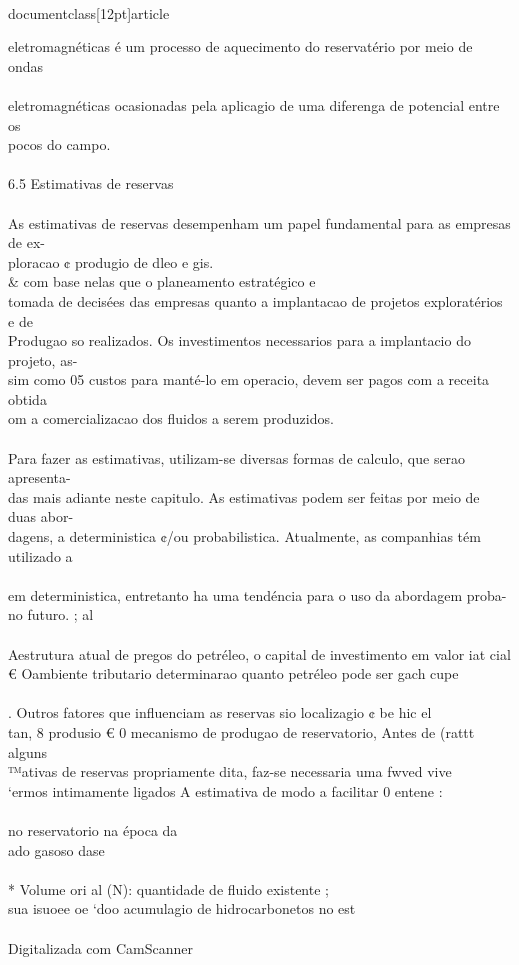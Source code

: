 \\documentclass[12pt]{article}
\begin{document}
eletromagnéticas é um processo de aquecimento do reservatério por meio de ondas\\
\\
eletromagnéticas ocasionadas pela aplicagio de uma diferenga de potencial entre os\\
pocos do campo.\\
\\
6.5 Estimativas de reservas\\
\\
As estimativas de reservas desempenham um papel fundamental para as empresas de ex-\\
ploracao ¢ produgio de dleo e gis. \\& com base nelas que o planeamento estratégico e\\
tomada de decisées das empresas quanto a implantacao de projetos exploratérios e de\\
Produgao so realizados. Os investimentos necessarios para a implantacio do projeto, as-\\
sim como 05 custos para manté-lo em operacio, devem ser pagos com a receita obtida\\
om a comercializacao dos fluidos a serem produzidos.\\
\\
Para fazer as estimativas, utilizam-se diversas formas de calculo, que serao apresenta-\\
das mais adiante neste capitulo. As estimativas podem ser feitas por meio de duas abor-\\
dagens, a deterministica ¢/ou probabilistica. Atualmente, as companhias tém utilizado a\\
\\
em deterministica, entretanto ha uma tendéncia para o uso da abordagem proba-\\
no futuro. ; al\\
\\
Aestrutura atual de pregos do petréleo, o capital de investimento em valor iat cial\\
€ Oambiente tributario determinarao quanto petréleo pode ser gach cupe\\
\\
. Outros fatores que influenciam as reservas sio localizagio ¢ be hic el\\
tan, 8 produsio € 0 mecanismo de produgao de reservatorio, Antes de (rattt alguns\\
™ativas de reservas propriamente dita, faz-se necessaria uma fwved vive\\
‘ermos intimamente ligados A estimativa de modo a facilitar 0 entene :\\
\\
no reservatorio na época da\\
ado gasoso dase\\
\\
* Volume ori al (N): quantidade de fluido existente ;\\
sua isuoee oe ‘doo acumulagio de hidrocarbonetos no est\\
\\
Digitalizada com CamScanner\\
\end{document}

